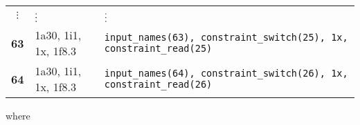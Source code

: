 \documentclass[a4paper,11pt]{article}
\begin{document}
\begin{center}
\begin{tabular}{|c|l|l|}
 $\vdots$      & $\hfill \vdots \hfill$ & $\hfill \vdots \hfill$       \\
 \textbf{63}   & 1a30, 1i1, 1x, 1f8.3 & \tt input\_names(63), constraint\_switch(25), 1x, constraint\_read(25) \\
 \textbf{64}   & 1a30, 1i1, 1x, 1f8.3 & \tt input\_names(64), constraint\_switch(26), 1x, constraint\_read(26) \\
\hline
\end{tabular}
\end{center}
\pagebreak
where 
\end{document}
